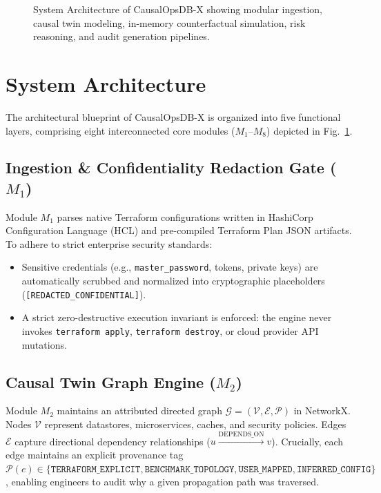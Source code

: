 \documentclass[conference]{IEEEtran}
\begin{document}
\begin{figure}[t]
{
}
\caption{System Architecture of CausalOpsDB-X showing modular ingestion, causal twin modeling, in-memory counterfactual simulation, risk reasoning, and audit generation pipelines.}
\label{fig:architecture}
\vspace{-1.0em}
\end{figure}

\section{System Architecture}
The architectural blueprint of CausalOpsDB-X is organized into five functional layers, comprising eight interconnected core modules ($M_1$--$M_8$) depicted in Fig.~\ref{fig:architecture}.

\subsection{Ingestion \& Confidentiality Redaction Gate ($M_1$)}
Module $M_1$ parses native Terraform configurations written in HashiCorp Configuration Language (HCL) and pre-compiled Terraform Plan JSON artifacts. To adhere to strict enterprise security standards:
\begin{itemize}
    \item Sensitive credentials (e.g., \texttt{master\_password}, tokens, private keys) are automatically scrubbed and normalized into cryptographic placeholders (\texttt{[REDACTED\_CONFIDENTIAL]}).
    \item A strict zero-destructive execution invariant is enforced: the engine never invokes \texttt{terraform apply}, \texttt{terraform destroy}, or cloud provider API mutations.
\end{itemize}

\subsection{Causal Twin Graph Engine ($M_2$)}
Module $M_2$ maintains an attributed directed graph $\mathcal{G} = (\mathcal{V}, \mathcal{E}, \mathcal{P})$ in NetworkX. Nodes $\mathcal{V}$ represent datastores, microservices, caches, and security policies. Edges $\mathcal{E}$ capture directional dependency relationships ($u \xrightarrow{\text{DEPENDS\_ON}} v$). Crucially, each edge maintains an explicit provenance tag $\mathcal{P}(e) \in \{\texttt{TERRAFORM\_EXPLICIT}, \texttt{BENCHMARK\_TOPOLOGY}, \texttt{USER\_MAPPED}, \texttt{INFERRED\_CONFIG}\}$, enabling engineers to audit why a given propagation path was traversed.
\end{document}
